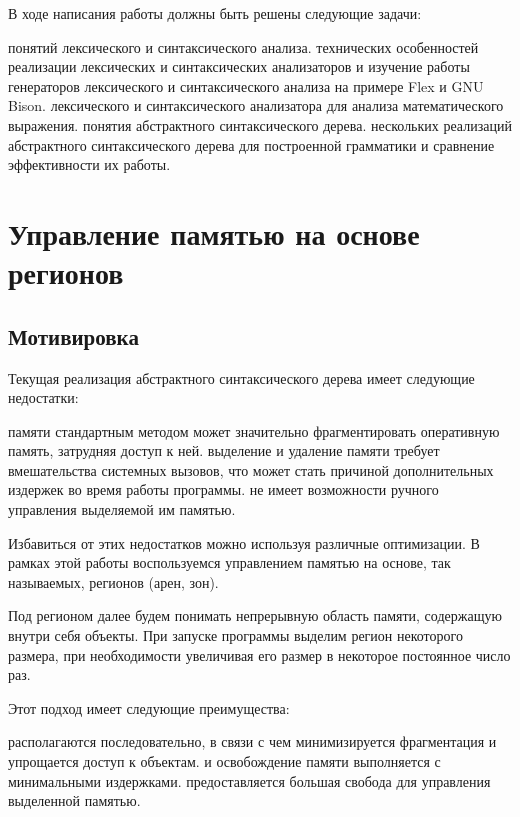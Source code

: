 \documentclass[coursework]{SCWorks}
\begin{document}
В ходе написания работы должны быть решены следующие задачи:
\begin{enumerate}
     понятий лексического и синтаксического анализа.
     технических особенностей реализации лексических и синтаксических анализаторов и изучение работы генераторов лексического и синтаксического анализа на примере Flex и GNU Bison.
     лексического и синтаксического анализатора для анализа математического выражения.
     понятия абстрактного синтаксического дерева.
     нескольких реализаций абстрактного синтаксического дерева для построенной грамматики и сравнение эффективности их работы.
\end{enumerate}
\section{Управление памятью на основе регионов}
\subsection{Мотивировка}
Текущая реализация абстрактного синтаксического дерева имеет следующие недостатки:
\begin{enumerate}
     памяти стандартным методом может значительно фрагментировать оперативную память, затрудняя доступ к ней.
     выделение и удаление памяти требует вмешательства системных вызовов, что может стать причиной дополнительных издержек во время работы программы.
     не имеет возможности ручного управления выделяемой им памятью.
\end{enumerate}

Избавиться от этих недостатков можно используя различные оптимизации. В рамках этой работы воспользуемся управлением памятью на основе, так называемых, регионов (арен, зон)\cite{11}.

Под регионом далее будем понимать непрерывную область памяти, содержащую внутри себя объекты. При запуске программы выделим регион некоторого размера, при необходимости увеличивая его размер в некоторое постоянное число раз.

Этот подход имеет следующие преимущества:
\begin{enumerate}
     располагаются последовательно, в связи с чем минимизируется фрагментация и упрощается доступ к объектам.
     и освобождение памяти выполняется с минимальными издержками.
     предоставляется большая свобода для управления выделенной памятью.
\end{enumerate}
\end{document}
